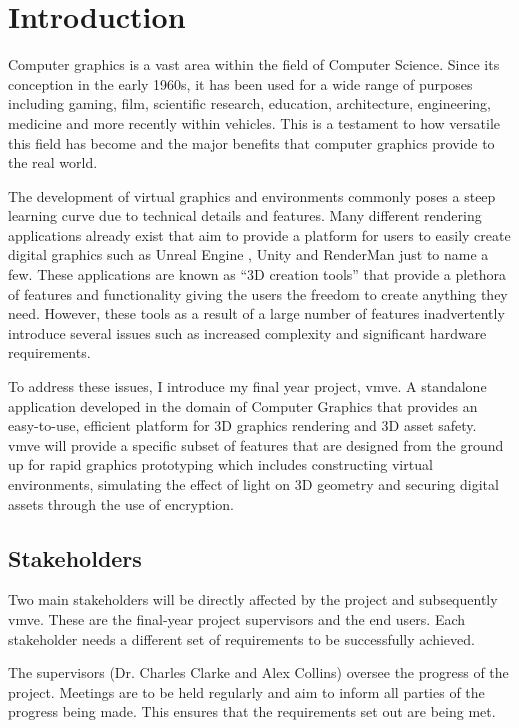 \documentclass[11pt]{article}
\begin{document}
\section{Introduction}
Computer graphics is a vast area within the field of Computer Science. Since its
conception in the early 1960s, it has been used for a wide range of purposes
including gaming, film, scientific research, education, architecture,
engineering, medicine and more recently within vehicles. This is a testament to
how versatile this field has become and the major benefits that computer
graphics provide to the real world.

The development of virtual graphics and environments commonly poses a steep
learning curve due to technical details and features. Many different rendering
applications already exist that aim to provide a platform for users to easily
create digital graphics such as  Unreal Engine \cite{unreal_engine}, Unity
\cite{unity} and RenderMan \cite{render_man} just to name a few. These
applications are known as ``3D creation tools'' that provide a plethora of
features and functionality giving the users the freedom to create anything they
need. However, these tools as a result of a large number of features
inadvertently introduce several issues such as increased complexity and
significant hardware requirements.

To address these issues, I introduce my final year project, \gls*{vmve}. A
standalone application developed in the domain of Computer Graphics that
provides an easy-to-use, efficient platform for 3D graphics rendering and 3D
asset safety. \gls*{vmve} will provide a specific subset of features that
are designed from the ground up for rapid graphics prototyping which includes
constructing virtual environments, simulating the effect of light on 3D geometry
and securing digital assets through the use of encryption.


\subsection{Stakeholders}
Two main stakeholders will be directly affected by the project and subsequently
\gls*{vmve}. These are the final-year project supervisors and the end users. Each
stakeholder needs a different set of requirements to be successfully achieved.

The supervisors (Dr. Charles Clarke and Alex Collins) oversee the progress of
the project. Meetings are to be held regularly and aim to inform all parties of
the progress being made. This ensures that the requirements set out are being
met.
\end{document}
